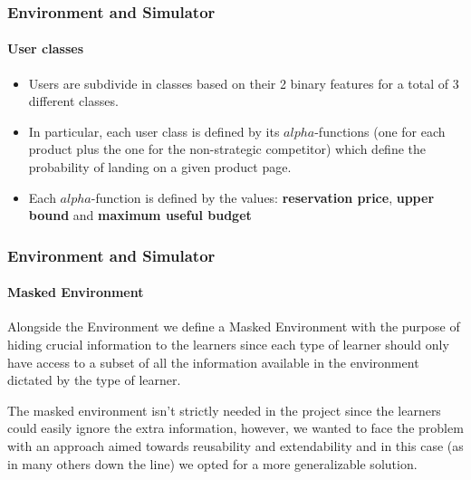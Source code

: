 \documentclass[11pt]{beamer}
\begin{document}

\begin{frame}

\frametitle{Environment and Simulator}
\framesubtitle{User classes}

\begin{itemize}[leftmargin=*, label={$\circ$}]
    \item Users are subdivide in classes based on their 2 binary features for a total of 3 different classes.
    \item In particular, each user class is defined by its $alpha$-functions (one for each product plus the one for the non-strategic competitor) which define the probability of landing on a given product page.
    \item Each $alpha$-function is defined by the values: \textbf{reservation price}, \textbf{upper bound} and \textbf{maximum useful budget}
\end{itemize}


\end{frame}


\begin{frame}

\frametitle{Environment and Simulator}
\framesubtitle{Masked Environment}

Alongside the Environment we define a Masked Environment with the purpose of hiding crucial information to the learners since each type of learner should only have access to a subset of all the information available in the environment dictated by the type of learner.

The masked environment isn't strictly needed in the project since the learners could easily ignore the extra information, however, we wanted to face the problem with an approach aimed towards reusability and extendability and in this case (as in many others down the line) we opted for a more generalizable solution.


\end{frame}
\end{document}
